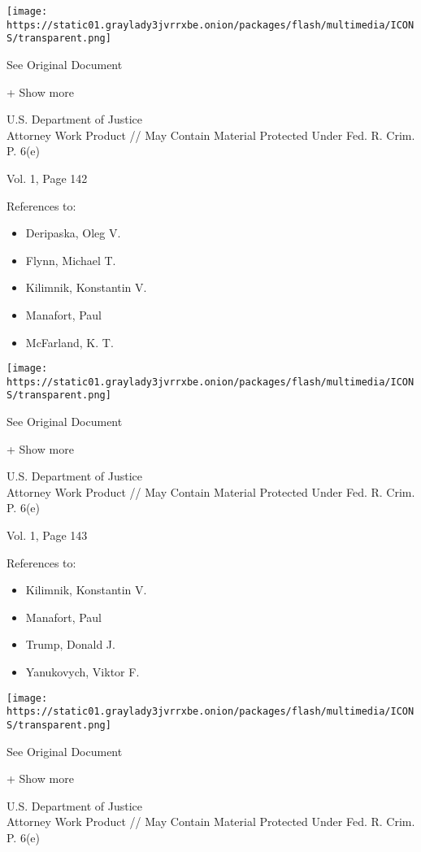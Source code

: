 \protect\hyperlink{}{}

\texttt{[image: https://static01.graylady3jvrrxbe.onion/packages/flash/multimedia/ICONS/transparent.png]}

See Original Document

+ Show more

U.S. Department of Justice\\
Attorney Work Product // May Contain Material Protected Under Fed. R.
Crim. P. 6(e)

Vol. 1, Page 142

References to:

\begin{itemize}
\tightlist
\item
  Deripaska, Oleg V.
\item
  Flynn, Michael T.
\item
  Kilimnik, Konstantin V.
\item
  Manafort, Paul 
\item
  McFarland, K. T.
\end{itemize}

\protect\hyperlink{}{}

\texttt{[image: https://static01.graylady3jvrrxbe.onion/packages/flash/multimedia/ICONS/transparent.png]}

See Original Document

+ Show more

U.S. Department of Justice\\
Attorney Work Product // May Contain Material Protected Under Fed. R.
Crim. P. 6(e)

Vol. 1, Page 143

References to:

\begin{itemize}
\tightlist
\item
  Kilimnik, Konstantin V.
\item
  Manafort, Paul 
\item
  Trump, Donald J.
\item
  Yanukovych, Viktor F.
\end{itemize}

\protect\hyperlink{}{}

\texttt{[image: https://static01.graylady3jvrrxbe.onion/packages/flash/multimedia/ICONS/transparent.png]}

See Original Document

+ Show more

U.S. Department of Justice\\
Attorney Work Product // May Contain Material Protected Under Fed. R.
Crim. P. 6(e)

